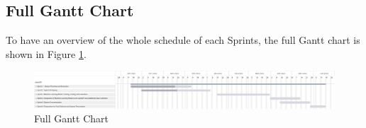 \subsection{Full Gantt Chart}
\label{subsec:gantt_chart_full}
To have an overview of the whole schedule of each Sprints, 
the full Gantt chart is shown in Figure \ref{fig:gantt_chart_full}.
\begin{figure}[ht]
    \centering
    \includegraphics[width=1\textwidth]{./assets/Gantt_Chart_Full.png}
    \caption{Full Gantt Chart}
    \label{fig:gantt_chart_full}
\end{figure}
\FloatBarrier
